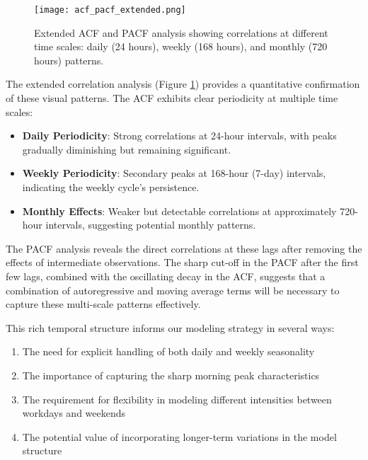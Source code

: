 \documentclass{article}
\begin{document}
\begin{figure}[htbp]
    \centering
    \texttt{[image: acf\_pacf\_extended.png]}
    \caption{Extended ACF and PACF analysis showing correlations at different time scales: daily (24 hours), weekly (168 hours), and monthly (720 hours) patterns.}
    \label{fig:acf_extended}
\end{figure}

The extended correlation analysis (Figure \ref{fig:acf_extended}) provides a quantitative confirmation of these visual patterns. The ACF exhibits clear periodicity at multiple time scales:

\begin{itemize}
    \item \textbf{Daily Periodicity}: Strong correlations at 24-hour intervals, with peaks gradually diminishing but remaining significant.
    \item \textbf{Weekly Periodicity}: Secondary peaks at 168-hour (7-day) intervals, indicating the weekly cycle's persistence.
    \item \textbf{Monthly Effects}: Weaker but detectable correlations at approximately 720-hour intervals, suggesting potential monthly patterns.
\end{itemize}

The PACF analysis reveals the direct correlations at these lags after removing the effects of intermediate observations. The sharp cut-off in the PACF after the first few lags, combined with the oscillating decay in the ACF, suggests that a combination of autoregressive and moving average terms will be necessary to capture these multi-scale patterns effectively.

This rich temporal structure informs our modeling strategy in several ways:
\begin{enumerate}
    \item The need for explicit handling of both daily and weekly seasonality
    \item The importance of capturing the sharp morning peak characteristics
    \item The requirement for flexibility in modeling different intensities between workdays and weekends
    \item The potential value of incorporating longer-term variations in the model structure
\end{enumerate}
\end{document}
